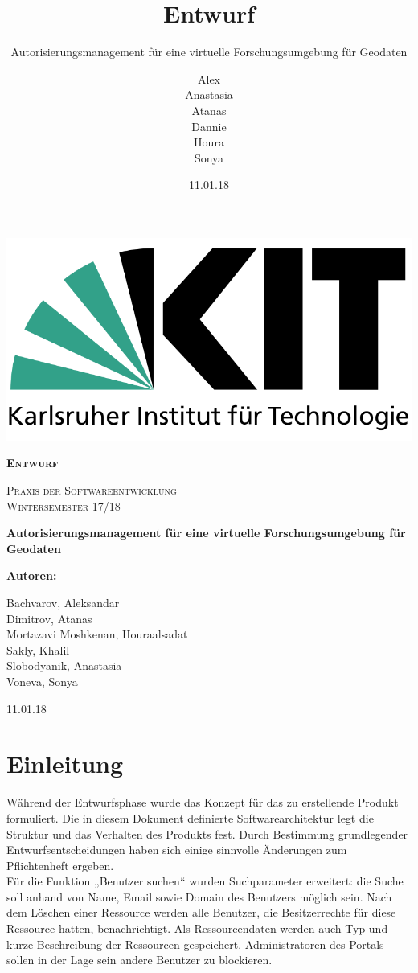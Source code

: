 \documentclass[parskip=full,11pt]{scrartcl}
\title{Entwurf}
\subtitle{Autorisierungsmanagement für eine virtuelle Forschungsumgebung für Geodaten}
\author{Alex\\Anastasia\\Atanas\\Dannie\\ Houra\\Sonya\\}
\date{11.01.18}
\begin{document}
 
 \begin{titlepage}
 	
 	\begin{center}
 	\includegraphics[width=0.5\linewidth]{res/KITLogo.png}\\
 	\vspace{2cm}
 	{\scshape\LARGE\bfseries Entwurf \par}
 	\vspace{0.5cm}
 	{\scshape\Large Praxis der Softwareentwicklung\\}
 	\vspace{1cm}
 	{\scshape\Large Wintersemester 17/18\\}
 	\vspace{2cm}
 	{\huge\bfseries Autorisierungsmanagement für eine virtuelle Forschungsumgebung für Geodaten\par}
 	\vspace{2cm}
 	\vfill
 	{\bfseries {\Large Autoren}:\par}
 	{\Large Bachvarov, Aleksandar }\\
 	{\Large Dimitrov, Atanas }\\
 	{\Large Mortazavi Moshkenan, Houraalsadat }\\
 	{\Large Sakly, Khalil }\\
 	{\Large Slobodyanik, Anastasia }\\
 	{\Large Voneva, Sonya}\\
 	\vfill
 	{\large 11.01.18 \par}
 	\end{center}
 \end{titlepage}
 
 \tableofcontents
 
 \newpage
 \section{Einleitung}
 
Während der Entwurfsphase wurde das Konzept für das zu erstellende Produkt formuliert. Die in diesem Dokument definierte Softwarearchitektur legt die Struktur und das Verhalten des Produkts fest. Durch Bestimmung grundlegender Entwurfsentscheidungen haben sich einige sinnvolle Änderungen zum Pflichtenheft ergeben. \\
Für die Funktion „Benutzer suchen“ wurden Suchparameter erweitert: die Suche soll anhand von Name, Email sowie Domain des Benutzers möglich sein. 
Nach dem Löschen einer Ressource werden alle Benutzer, die Besitzerrechte für diese Ressource hatten, benachrichtigt. 
Als Ressourcendaten werden auch Typ und kurze Beschreibung der Ressourcen gespeichert. 
Administratoren des Portals sollen in der Lage sein andere Benutzer zu blockieren.
\end{document}
